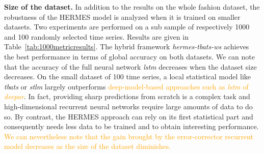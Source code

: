 \documentclass[10pt]{article} %
\begin{document}
\textbf{Size of the dataset. } In addition to the results on the whole fashion dataset, the robustness of the HERMES model is analyzed when it is trained on smaller datasets. Two experiments are performed on a sub sample of respectively 1000 and 100 randomly selected time series. Results are given in Table~\ref{tab:1000metricresults}. The hybrid framework \textit{hermes-tbats-ws} achieves the best performance in terms of global accuracy on both datasets. We can note that the accuracy of the full neural network \textit{lstm} decreases when the dataset size decreases. On the small dataset of 100 time series, a local statistical model like \textit{tbats} or \textit{stlm} largely outperforms \textcolor{orange}{deep-model-based approaches such as \textit{lstm} of \textit{deepar}}. In fact, providing sharp predictions from scratch is a complex task and high-dimensional recurrent neural networks require large amounts of data to do so. By contrast, the HERMES approach can rely on its first statistical part and consequently needs less data to be trained and to obtain interesting performance. \textcolor{orange}{We can nevertheless note that the gain brought by the error-corrector recurrent model decreases as the size of the dataset diminishes.}
\end{document}
